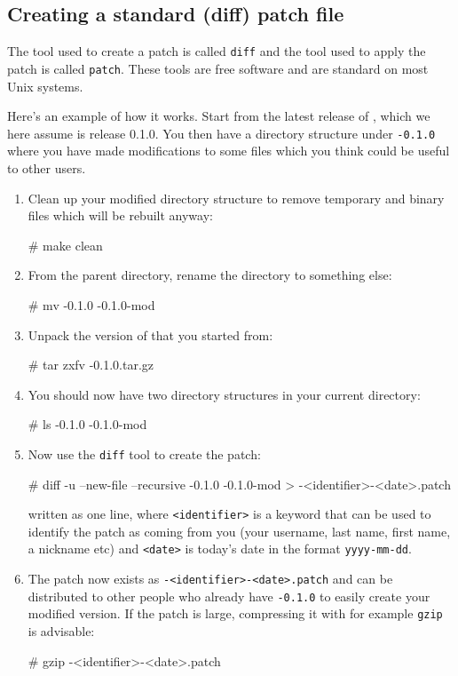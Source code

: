   
\subsection{Creating a standard (diff) patch file}

The tool used to create a patch is called \texttt{diff} and the tool
used to apply the patch is called \texttt{patch}. These tools are free
software and are standard on most Unix systems.

Here's an example of how it works. Start from the latest release of
\package{}, which we here assume is release 0.1.0. You then have a
directory structure under \texttt{\packagett{}-0.1.0} where you have made
modifications to some files which you think could be useful to
other users.

\begin{enumerate}
\item
  Clean up your modified directory structure to remove temporary and binary
  files which will be rebuilt anyway:
  \begin{code}
# make clean
  \end{code}
\item
  From the parent directory, rename the \package{} directory to something else:
  \begin{macrocode}
# mv \packagett{}-0.1.0 \packagett{}-0.1.0-mod
  \end{macrocode}
\item
  Unpack the version of \package{} that you started from:
  \begin{macrocode}
# tar zxfv \packagett{}-0.1.0.tar.gz
  \end{macrocode}
\item
  You should now have two \package{} directory structures in your current directory:
  \begin{macrocode}
# ls
\packagett{}-0.1.0
\packagett{}-0.1.0-mod
  \end{macrocode}
\item
  Now use the \texttt{diff} tool to create the patch:
  \begin{macrocode}
# diff -u --new-file --recursive \packagett{}-0.1.0
  \packagett{}-0.1.0-mod > \packagett{}-<identifier>-<date>.patch
  \end{macrocode}
  written as one line, where \texttt{<identifier>} is a keyword that
  can be used to identify the patch as coming from you (your username,
  last name, first name, a nickname etc) and \texttt{<date>} is
  today's date in the format \texttt{yyyy-mm-dd}.
\item
  The patch now exists as \texttt{\packagett{}-<identifier>-<date>.patch}
  and can be distributed to other people who already have
  \texttt{\packagett{}-0.1.0} to easily create your modified version. If the
  patch is large, compressing it with for example \texttt{gzip} is
  advisable:
  \begin{macrocode}
# gzip \packagett{}-<identifier>-<date>.patch
  \end{macrocode}
\end{enumerate}

